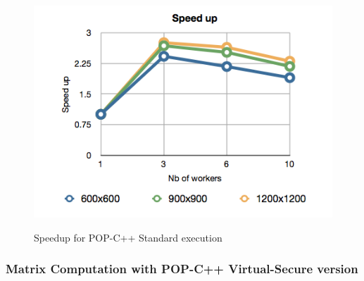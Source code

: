 \begin{figure}[ht]
	\caption{Speedup for POP-C++ Standard execution}
  	\centering
	\includegraphics[scale=0.6]{./pic/speedup_std.png}
	\label{fig:speedup1}
\end{figure}

\subsubsection{Matrix Computation with POP-C++ Virtual-Secure version}



